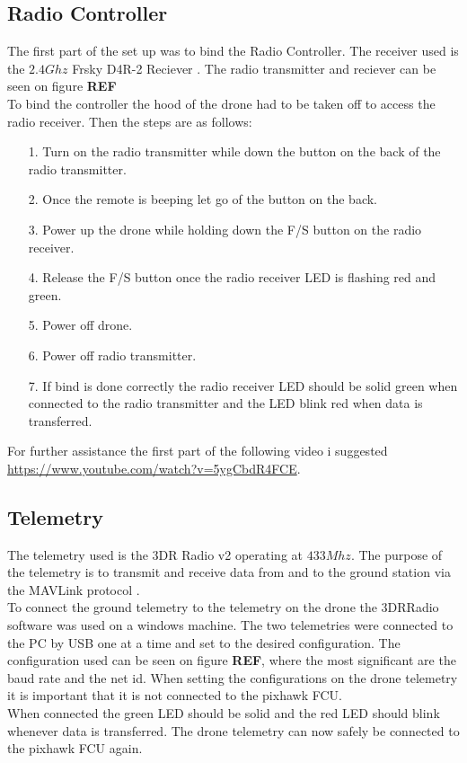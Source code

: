 \subsection{Radio Controller}
The first part of the set up was to bind the Radio Controller. The receiver used is the $2.4 Ghz$ Frsky D4R-2 Reciever \cite{Ref:FrSky}. The radio transmitter and reciever can be seen on figure \textbf{REF}\\ 
To bind the controller the hood of the drone had to be taken off to access the radio receiver. Then the steps are as follows:
\begin{itemize}
\item[1.] Turn on the radio transmitter while down the button on the back of the radio transmitter.
\item[2.] Once the remote is beeping let go of the button on the back.
\item[3.] Power up the drone while holding down the F/S button on the radio receiver.
\item[4.] Release the F/S button once the radio receiver LED is flashing red and green.
\item[5.] Power off drone.
\item[6.] Power off radio transmitter.
\item[7.] If bind is done correctly the radio receiver LED should be solid green when connected to the radio transmitter and the LED blink red when data is transferred.
\end{itemize}
For further assistance the first part of the following video i suggested \url{https://www.youtube.com/watch?v=5ygCbdR4FCE}.

\subsection{Telemetry}
The telemetry used is the 3DR Radio v2 \cite{Ref:Telem} operating at $433 Mhz$. The purpose of the telemetry is to transmit and receive data from and to the ground station via the MAVLink protocol \cite{Ref:MAVLink}.\\
To connect the ground telemetry to the telemetry on the drone the 3DRRadio software was used on a windows machine. The two telemetries were connected to the PC by USB one at a time and set to the desired configuration. The configuration used can be seen on figure \textbf{REF}, where the most significant are the baud rate and the net id. When setting the configurations on the drone telemetry it is important that it is not connected to the pixhawk FCU.\\
When connected the green LED should be solid and the red LED should blink whenever data is transferred. The drone telemetry can now safely be connected to the pixhawk FCU again.

